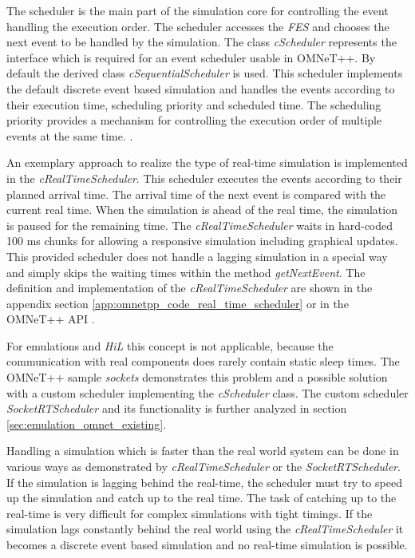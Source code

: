 The scheduler is the main part of the simulation core for controlling the event handling the execution order.
The scheduler accesses the \emph{FES} and chooses the next event to be handled by the simulation.
The class \emph{cScheduler} represents the interface which is required for an event scheduler usable in OMNeT++.
By default the derived class \emph{cSequentialScheduler} is used.
This scheduler implements the default discrete event based simulation and handles the events according to their execution time, scheduling priority and scheduled time.
The scheduling priority provides a mechanism for controlling the execution order of multiple events at the same time. \cite[section 4.1]{omnet_manual}.

An exemplary approach to realize the type of real-time simulation is implemented in the \emph{cRealTimeScheduler}.
This scheduler executes the events according to their planned arrival time.
The arrival time of the next event is compared with the current real time.
When the simulation is ahead of the real time, the simulation is paused for the remaining time.
The \emph{cRealTimeScheduler} waits in hard-coded 100 ms chunks for allowing a responsive simulation including graphical updates.
This provided scheduler does not handle a lagging simulation in a special way and simply skips the waiting times within the method \emph{getNextEvent}. 
The definition and implementation of the \emph{cRealTimeScheduler} are shown in the appendix section \ref{app:omnetpp_code_real_time_scheduler} or in the OMNeT++ API \cite[cRealTimeScheduler]{omnet_api}.

For emulations and \emph{HiL} this concept is not applicable, because the communication with real components does rarely contain static sleep times.
The OMNeT++ sample \emph{sockets} demonstrates this problem and a possible solution with a custom scheduler implementing the \emph{cScheduler} class.
The custom scheduler \emph{SocketRTScheduler} and its functionality is further analyzed in section \ref{sec:emulation_omnet_existing}.

Handling a simulation which is faster than the real world system can be done in various ways as demonstrated by \emph{cRealTimeScheduler} or the \emph{SocketRTScheduler}.
If the simulation is lagging behind the real-time, the scheduler must try to speed up the simulation and catch up to the real time.
The task of catching up to the real-time is very difficult for complex simulations with tight timings.
If the simulation lags constantly behind the real world using the \emph{cRealTimeScheduler} it becomes a discrete event based simulation and no real-time simulation is possible.

